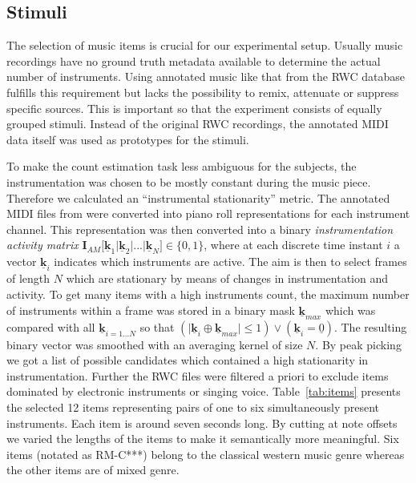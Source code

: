 \subsection{Stimuli}

The selection of music items is crucial for our experimental setup. Usually music recordings have no ground truth metadata available to determine the actual number of instruments. Using annotated music like that from the RWC database~\cite{rwc} fulfills this requirement but lacks the possibility to remix, attenuate or suppress specific sources. This is important so that the experiment consists of equally grouped stimuli. Instead of the original RWC recordings, the annotated MIDI data itself was used as prototypes for the stimuli.

To make the count estimation task less ambiguous for the subjects, the instrumentation was chosen to be mostly constant during the music piece.
Therefore we calculated an ``instrumental stationarity'' metric.
The annotated MIDI files from \cite{rwc} were converted into piano roll representations for each instrument channel. This representation was then converted into a binary \emph{instrumentation activity matrix} $\mathbf{I}_{AM}\lbrack \mathbf{\underline{k}}_1 \vert \mathbf{\underline{k}}_2 \vert  ... \vert \mathbf{\underline{k}}_N \rbrack \in \{0,1\}$, where at each discrete time instant $i$ a vector $\mathbf{\underline{k}}_i$ indicates which instruments are active. The aim is then to select frames of length $N$ which are stationary by means of changes in instrumentation and activity. To get many items with a high instruments count, the maximum number of instruments within a frame was stored in a binary mask $\mathbf{\underline{k}}_{max}$ which was compared with all $\mathbf{\underline{k}}_{i=1...N}$ so that $(\vert\mathbf{\underline{k}}_{i} \oplus \mathbf{\underline{k}}_{max}\vert \leq 1) \lor (\mathbf{\underline{k}}_{i} = \underline{0})$. The resulting binary vector was smoothed with an averaging kernel of size $N$. By peak picking we got a list of possible candidates which contained a high stationarity in instrumentation.
Further the RWC files were filtered a priori to exclude items dominated by electronic instruments or singing voice. Table~\ref{tab:items} presents the selected 12 items representing pairs of one to six simultaneously present instruments. Each item is around seven seconds long. By cutting at note offsets we varied the lengths of the items to make it semantically more meaningful. Six items (notated as RM-C***) belong to the classical western music genre whereas the other items are of mixed genre.
